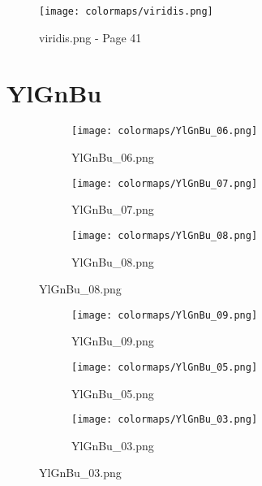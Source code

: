 \documentclass{article}%
\begin{document}
%


\begin{figure}[h!]%
\centering%
\texttt{[image: colormaps/viridis.png]}%
\caption{viridis.png {-} Page 41}%
\end{figure}

%
%
\section{YlGnBu}%
\label{sec:YlGnBu}%
\hspace{1cm}\hfill%
\hspace{1cm}\hfill%
\hspace{1cm}\hfill%


\begin{figure}[h!]%
\begin{subfigure}[b]{0.3\linewidth}%
\texttt{[image: colormaps/YlGnBu\_06.png]}%
\caption{YlGnBu\_06.png}%
\end{subfigure}%
\begin{subfigure}[b]{0.3\linewidth}%
\texttt{[image: colormaps/YlGnBu\_07.png]}%
\caption{YlGnBu\_07.png}%
\end{subfigure}%
\begin{subfigure}[b]{0.3\linewidth}%
\texttt{[image: colormaps/YlGnBu\_08.png]}%
\caption{YlGnBu\_08.png}%
\end{subfigure}%
\end{figure}

%
\hspace{1cm}\hfill%
\hspace{1cm}\hfill%
\hspace{1cm}\hfill%


\begin{figure}[h!]%
\begin{subfigure}[b]{0.3\linewidth}%
\texttt{[image: colormaps/YlGnBu\_09.png]}%
\caption{YlGnBu\_09.png}%
\end{subfigure}%
\begin{subfigure}[b]{0.3\linewidth}%
\texttt{[image: colormaps/YlGnBu\_05.png]}%
\caption{YlGnBu\_05.png}%
\end{subfigure}%
\begin{subfigure}[b]{0.3\linewidth}%
\texttt{[image: colormaps/YlGnBu\_03.png]}%
\caption{YlGnBu\_03.png}%
\end{subfigure}%
\end{figure}
\end{document}
